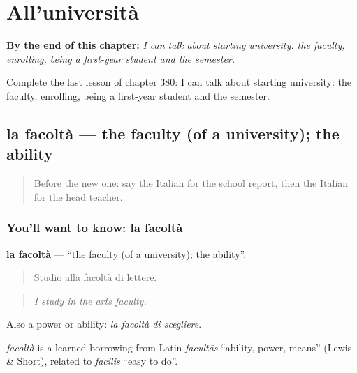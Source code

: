
\chapter{All'università}
\label{ch:it-all-universita}

\begin{chapteropening}
\textbf{By the end of this chapter:} \emph{I can talk about starting university: the faculty, enrolling, being a first-year student and the semester.}

Complete the last lesson of chapter 380: I can talk about starting university: the faculty, enrolling, being a first-year student and the semester.
\end{chapteropening}

\section[la facoltà]{la facoltà — the faculty (of a university); the ability}

\label{lesson:IT-C380-facolta}



\begin{quote}
Before the new one: say the Italian for the school report, then the Italian for the head teacher.
\end{quote}

\subsection*{You'll want to know: la facoltà}
\textbf{la facoltà} — \textquotedblleft{}the faculty (of a university); the ability\textquotedblright{}.

\begin{quote}
Studio alla facoltà di lettere.
\end{quote}

\begin{quote}
\emph{I study in the arts faculty.}
\end{quote}

Also a power or ability: \emph{la facoltà di scegliere}.

\begin{cousinweb}
\emph{facoltà} is a learned borrowing from Latin \emph{facultās} \textquotedblleft{}ability, power, means\textquotedblright{} (Lewis \& Short), related to \emph{facilis} \textquotedblleft{}easy to do\textquotedblright{}.
\end{cousinweb}

